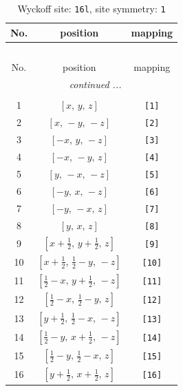 \documentclass[fleqn,8pt]{jsarticle}
\begin{document}
\begin{longtable}{ccc}
\caption{Wyckoff site: {\tt 16l}, site symmetry: {\tt 1}}
 \\
 \hline \hline
No. & position & mapping \\ \hline \endfirsthead

\multicolumn{2}{l}{\tablename\ \thetable{}} \\
 \hline \hline
No. & position & mapping \\ \hline \endhead

 \hline \hline
\multicolumn{2}{r}{\footnotesize\it continued ...} \\ \endfoot

 \hline \hline
\multicolumn{2}{r}{} \\ \endlastfoot

1 & $\left[ x,\, y,\, z \right]$ & {\tt [1]} \\ \hline
2 & $\left[ x,\, - y,\, - z \right]$ & {\tt [2]} \\ \hline
3 & $\left[ - x,\, y,\, - z \right]$ & {\tt [3]} \\ \hline
4 & $\left[ - x,\, - y,\, z \right]$ & {\tt [4]} \\ \hline
5 & $\left[ y,\, - x,\, - z \right]$ & {\tt [5]} \\ \hline
6 & $\left[ - y,\, x,\, - z \right]$ & {\tt [6]} \\ \hline
7 & $\left[ - y,\, - x,\, z \right]$ & {\tt [7]} \\ \hline
8 & $\left[ y,\, x,\, z \right]$ & {\tt [8]} \\ \hline
9 & $\left[ x + \frac{1}{2},\, y + \frac{1}{2},\, z \right]$ & {\tt [9]} \\ \hline
10 & $\left[ x + \frac{1}{2},\, \frac{1}{2} - y,\, - z \right]$ & {\tt [10]} \\ \hline
11 & $\left[ \frac{1}{2} - x,\, y + \frac{1}{2},\, - z \right]$ & {\tt [11]} \\ \hline
12 & $\left[ \frac{1}{2} - x,\, \frac{1}{2} - y,\, z \right]$ & {\tt [12]} \\ \hline
13 & $\left[ y + \frac{1}{2},\, \frac{1}{2} - x,\, - z \right]$ & {\tt [13]} \\ \hline
14 & $\left[ \frac{1}{2} - y,\, x + \frac{1}{2},\, - z \right]$ & {\tt [14]} \\ \hline
15 & $\left[ \frac{1}{2} - y,\, \frac{1}{2} - x,\, z \right]$ & {\tt [15]} \\ \hline
16 & $\left[ y + \frac{1}{2},\, x + \frac{1}{2},\, z \right]$ & {\tt [16]} \\
\end{longtable}
\end{document}
